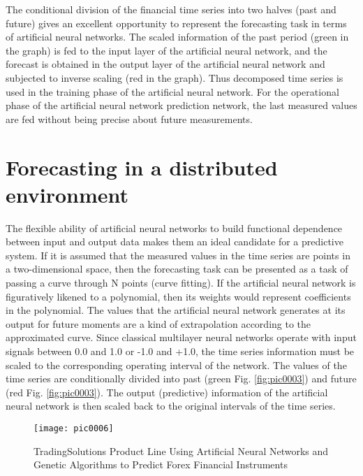 The conditional division of the financial time series into two halves (past and future) gives an excellent opportunity to represent the forecasting task in terms of artificial neural networks. The scaled information of the past period (green in the graph) is fed to the input layer of the artificial neural network, and the forecast is obtained in the output layer of the artificial neural network and subjected to inverse scaling (red in the graph). Thus decomposed time series is used in the training phase of the artificial neural network. For the operational phase of the artificial neural network prediction network, the last measured values are fed without being precise about future measurements.

\section{Forecasting in a distributed environment}

The flexible ability of artificial neural networks to build functional dependence between input and output data makes them an ideal candidate for a predictive system. If it is assumed that the measured values in the time series are points in a two-dimensional space, then the forecasting task can be presented as a task of passing a curve through N points (curve fitting). If the artificial neural network is figuratively likened to a polynomial, then its weights would represent coefficients in the polynomial. The values that the artificial neural network generates at its output for future moments are a kind of extrapolation according to the approximated curve. Since classical multilayer neural networks operate with input signals between 0.0 and 1.0 or -1.0 and +1.0, the time series information must be scaled to the corresponding operating interval of the network. The values of the time series are conditionally divided into past (green Fig. \ref{fig:pic0003}) and future (red Fig. \ref{fig:pic0003}). The output (predictive) information of the artificial neural network is then scaled back to the original intervals of the time series.

\begin{figure}[h]
\centering
\texttt{[image: pic0006]}
\caption{TradingSolutions Product Line Using Artificial Neural Networks and Genetic Algorithms to Predict Forex Financial Instruments}
\label{fig:pic0006}
\end{figure}

